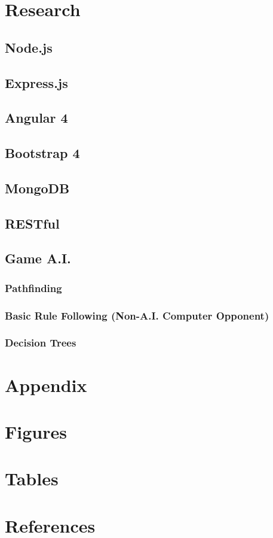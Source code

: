\documentclass[12pt,a4paper]{report}
\begin{document}
	\newpage
	\section{Research}
			\subsection{Node.js}
			\subsection{Express.js}
			\subsection{Angular 4}
			\subsection{Bootstrap 4}
			\subsection{MongoDB}
			\subsection{RESTful}
			\subsection{Game A.I.}
				\subsubsection{Pathfinding}
				\subsubsection{Basic Rule Following (Non-A.I. Computer Opponent)}
				\subsubsection{Decision Trees}
	
	\newpage
	\section{Appendix}
	
	\newpage
	\section{Figures}
	
	\newpage
	\section{Tables}
	
	\newpage
	\section{References}
		
\end{document}
